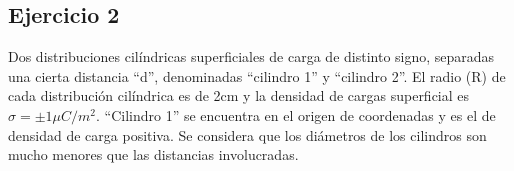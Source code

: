 \documentclass{article}
\begin{document}

    

\subsection{Ejercicio 2}
Dos distribuciones cilíndricas superficiales de carga de distinto signo, separadas una cierta distancia “d”, denominadas “cilindro 1” y “cilindro 2”. 
El radio (R) de cada distribución cilíndrica es de 2cm y la densidad de cargas superficial es $ \sigma = \pm 1 \mu C/m^2 $. 
“Cilindro 1” se encuentra en el origen de coordenadas y es el de densidad de carga positiva. 
Se considera que los diámetros de los cilindros son mucho menores que las distancias involucradas.
\end{document}
